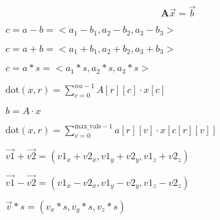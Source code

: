 \documentclass{article}
\begin{document}
\[
\textbf{A} \vec{x} = \vec{b}
\]
\pagebreak

$ c = a - b = <a_1 - b_1, a_2 - b_2, a_3 - b_3> $
\pagebreak

$ c = a + b = <a_1 + b_1, a_2 + b_2, a_3 + b_3> $
\pagebreak

$ c = a * s = <a_1 * s, a_2 * s, a_3 * s> $
\pagebreak

$ \text{dot}(x, r) = \sum_{c=0}^{nu-1} A[r][c] \cdot x[c] $
\pagebreak

$ b = A \cdot x $
\pagebreak

$ \text{dot}(x, r) = \sum_{v=0}^{\text{max\_vals}-1} a[r][v] \cdot x[c[r][v]] $
\pagebreak

$ \vec{v1} + \vec{v2} = (v1_x + v2_x, v1_y + v2_y, v1_z + v2_z) $
\pagebreak

$ \vec{v1} - \vec{v2} = (v1_x - v2_x, v1_y - v2_y, v1_z - v2_z) $
\pagebreak

$ \vec{v} * s = (v_x * s, v_y * s, v_z * s) $
\pagebreak
\end{document}

